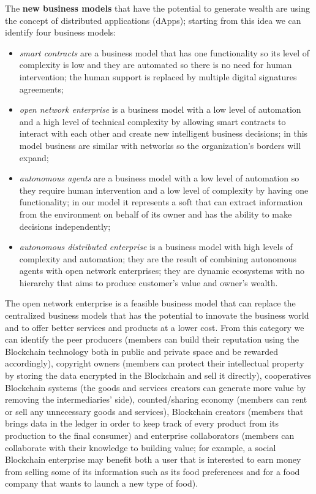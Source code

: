 The \textbf{new business models} that have the potential to generate wealth are using the concept of distributed applications (dApps); starting from this idea we can identify four business models: 
\begin{itemize}
	\item \emph{smart contracts} are a business model that has one functionality so its level of complexity is low and they are automated so there is no need for human intervention; the human support is replaced by multiple digital signatures agreements;
	\item \emph{open network enterprise} is a business model with a low level of automation and a high level of technical complexity by allowing smart contracts to interact with each other and create new intelligent business decisions; in this model business are similar with networks so the organization's borders will expand;
	\item \emph{autonomous agents} are a business model with a low level of automation so they require human intervention and a low level of complexity by having one functionality; in our model it represents a soft that can extract information from the environment on behalf of its owner and has the ability to make decisions independently;
	\item \emph{autonomous distributed enterprise} is a business model with high levels of complexity and automation; they are the result of combining autonomous agents with open network enterprises; they are dynamic ecosystems with no hierarchy that aims to produce customer's value and owner's wealth.
\end{itemize}
The open network enterprise is a feasible business model that can replace the centralized business models that has the potential to innovate the business world and to offer better services and products at a lower cost. From this category we can identify the peer producers (members can build their reputation using the Blockchain technology both in public and private space and be rewarded accordingly), copyright owners (members can protect their intellectual property by storing the data encrypted in the Blockchain and sell it directly), cooperatives Blockchain systems (the goods and services creators can generate more value by removing the intermediaries' side), counted/sharing economy (members can rent or sell any unnecessary goods and services), Blockchain creators (members that brings data in the ledger in order to keep track of every product from its production to the final consumer) and enterprise collaborators (members can collaborate with their knowledge to building value; for example, a social Blockchain enterprise may benefit both a user that is interested to earn money from selling some of its information such as its food preferences and for a food company that wants to launch a new  type of food).

